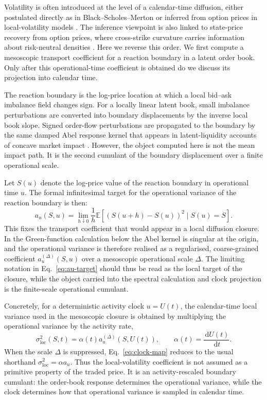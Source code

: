 \documentclass[11pt]{amsart}
\newcommand{\E}{\mathbb{E}}
\newcommand{\dd}{\,\mathrm{d}}
\newcommand{\sigloc}{\sigma_{\mathrm{loc}}}
\theoremstyle{definition}
\theoremstyle{plain}
\theoremstyle{remark}
\begin{document}
Volatility is often introduced at the level of a calendar-time diffusion, either postulated directly as in Black--Scholes--Merton or inferred from option prices in local-volatility models \cite{BlackScholes1973,Merton1973,Dupire1994,Gatheral2006}. The inference viewpoint is also linked to state-price recovery from option prices, where cross-strike curvature carries information about risk-neutral densities \cite{BreedenLitzenberger1978}. Here we reverse this order. We first compute a mesoscopic transport coefficient for a reaction boundary in a latent order book. Only after this operational-time coefficient is obtained do we discuss its projection into calendar time.

The reaction boundary is the log-price location at which a local bid--ask imbalance field changes sign. For a locally linear latent book, small imbalance perturbations are converted into boundary displacements by the inverse local book slope. Signed order-flow perturbations are propagated to the boundary by the same damped Abel response kernel that appears in latent-liquidity accounts of concave market impact \cite{bouchaud2009markets,toth2011anomalous,Mastromatteo2014,Donier2015}. However, the object computed here is not the mean impact path. It is the second cumulant of the boundary displacement over a finite operational scale.

Let $S(u)$ denote the log-price value of the reaction boundary in operational time $u$. The formal infinitesimal target for the operational variance of the reaction boundary is then:
\begin{equation}
 a_u(S,u)=\lim_{h\downarrow0}\frac{1}{h}
 \E\left[(S(u+h)-S(u))^2\mid S(u)=S\right].
 \label{eq:au-target}
\end{equation}
This fixes the transport coefficient that would appear in a local diffusion closure. In the Green-function calculation below the Abel kernel is singular at the origin, and the operational variance is therefore realised as a regularised, coarse-grained coefficient $a_u^{(\Delta)}(S,u)$ over a mesoscopic operational scale $\Delta$. The limiting notation in Eq.~\eqref{eq:au-target} should thus be read as the local target of the closure, while the object carried into the spectral calculation and clock projection is the finite-scale operational cumulant.

Concretely, for a deterministic activity clock $u=U(t)$, the calendar-time local variance used in the mesoscopic closure is obtained by multiplying the operational variance by the activity rate,
\begin{equation}
 \sigloc^2(S,t)=\alpha(t)a_u^{(\Delta)}(S,U(t)),
 \qquad \alpha(t)=\frac{\dd U(t)}{\dd t}.
 \label{eq:clock-map}
\end{equation}
When the scale $\Delta$ is suppressed, Eq.~\eqref{eq:clock-map} reduces to the usual shorthand $\sigloc^2=\alpha a_u$. Thus the local-volatility coefficient is not assumed as a primitive property of the traded price. It is an activity-rescaled boundary cumulant: the order-book response determines the operational variance, while the clock determines how that operational variance is sampled in calendar time.
\end{document}
